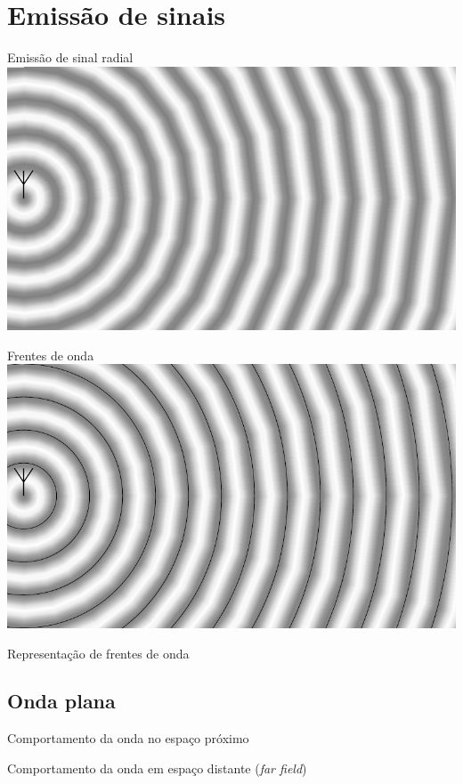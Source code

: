 
\section{Emissão de sinais}

    \begin{frame}{Emissão de sinal radial}
        \includegraphics{../pictures/signal.pdf}
    \end{frame}

    \begin{frame}{Frentes de onda}
        \includegraphics{../pictures/signal+lines.pdf}
    \end{frame}

    \begin{frame}{Representação de frentes de onda}
        
    \end{frame}

\subsection{Onda plana}

    \begin{frame}{Comportamento da onda no espaço próximo}
        
    \end{frame}

    \begin{frame}{Comportamento da onda em espaço distante (\textit{far field})}
        
    \end{frame}
